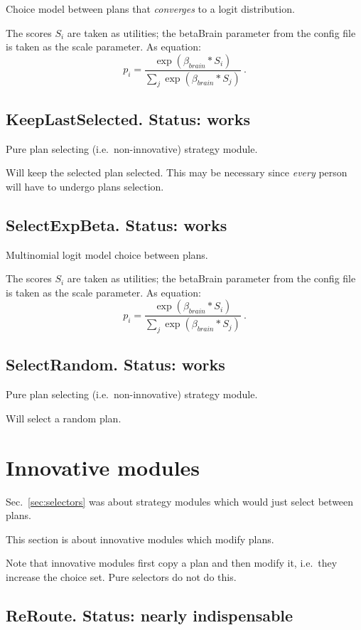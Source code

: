 Choice model between plans that \emph{converges} to a logit distribution.

The scores $S_i$ are taken as utilities; the betaBrain parameter from the  config file is taken as the scale parameter. As equation:
\[
p_i = \frac{\exp( \beta_{brain} * S_i)}{\sum_j \exp( \beta_{brain} * S_j )} \ .
\]

\subsection{KeepLastSelected. Status: works}

Pure plan selecting (i.e.\ non-innovative) strategy module.

Will keep the selected plan selected.  This may be necessary since \emph{every} person will have to undergo plans selection.

\subsection{SelectExpBeta. Status: works}

Multinomial logit model choice between plans.

The scores $S_i$ are taken as utilities; the betaBrain parameter from the  config file is taken as the scale parameter. As equation:
\[
p_i = \frac{\exp( \beta_{brain} * S_i)}{\sum_j \exp( \beta_{brain} * S_j )} \ .
\]

\subsection{SelectRandom.  Status: works}

Pure plan selecting (i.e.\ non-innovative) strategy module.

Will select a random plan.

\umbruch
\section{Innovative modules}

Sec.~\ref{sec:selectors} was about strategy modules which would just select between plans.

This section is about innovative modules which modify plans.

Note that innovative modules first copy a plan and then modify it, i.e.\ they increase the choice set.  Pure selectors do not do this.

\subsection{ReRoute.  Status: nearly indispensable}

